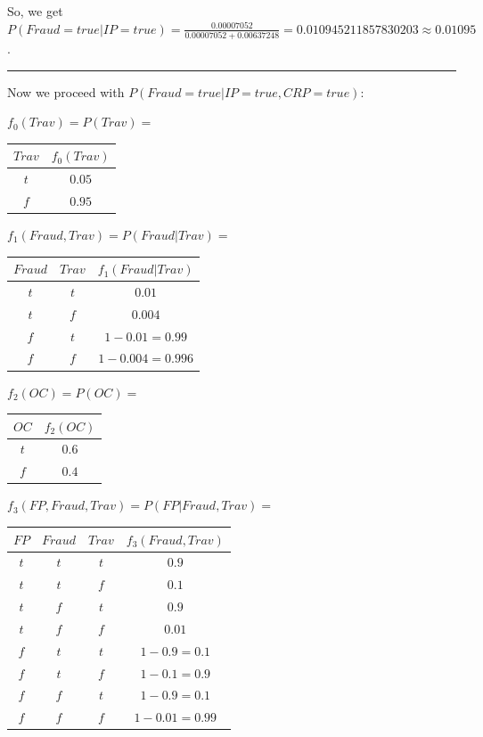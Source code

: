 \documentclass[10pt]{article}
\begin{document}
\begin{enumerate}
	So, we get $P(Fraud = true | IP = true) = \frac{0.00007052}{0.00007052 + 0.00637248} = 0.010945211857830203 \approx 0.01095$.
	
	\noindent\rule[0.5ex]{\linewidth/2}{1pt}
	
	Now we proceed with $P(Fraud = true | IP = true, CRP = true)$:
	
	$f_0(Trav) = P(Trav) = $
	\begin{tabular}{|c|c|}
	\hline
 	  $Trav$ & $f_0(Trav)$ \\
	\hline
	  $t$ & $ 0.05$  \\
	\hline
	  $f$ & $0.95$ \\
	\hline
	\end{tabular}

	$f_1(Fraud, Trav) = P(Fraud | Trav) =$
	\begin{tabular}{|c|c|c|}
	\hline
 	  $Fraud$ & $Trav$ & $f_1(Fraud | Trav)$ \\
	\hline
	  $t$ & $t$ & $0.01$  \\
	\hline
	 $t$ & $f$ & $0.004$  \\
	\hline
	  $f$ & $t$ & $1 - 0.01 = 0.99$ \\
	\hline
	$f$ & $f$ & $1 - 0.004 = 0.996$  \\
	\hline
	\end{tabular}
	
	$f_2(OC) = P(OC) = $
	\begin{tabular}{|c|c|}
	\hline
 	  $OC$ & $f_2(OC)$ \\
	\hline
	  $t$ & $ 0.6$  \\
	\hline
	  $f$ & $0.4$ \\
	\hline
	\end{tabular}
	
	$f_3(FP, Fraud, Trav) = P(FP | Fraud, Trav) = $
	\begin{tabular}{|c|c|c|c|}
	\hline
 	  $FP$ & $Fraud$ & $Trav$ & $f_3(Fraud, Trav)$ \\
 	  \hline
	  $t$ & $t$ & $t$ & $0.9$\\
	  \hline
	  $t$ & $t$ & $f$ & $0.1$\\
	  \hline
	  $t$ & $f$ & $t$ & $0.9$\\
	  \hline
	  $t$ & $f$ & $f$ & $0.01$\\
	  \hline
	  $f$ & $t$ & $t$ & $1 - 0.9 = 0.1$\\
	  \hline
	  $f$ & $t$ & $f$ & $1 - 0.1 = 0.9$\\
	  \hline
	  $f$ & $f$ & $t$ & $1 - 0.9 = 0.1$\\
	  \hline
	  $f$ & $f$ & $f$ & $1 - 0.01 = 0.99$\\
	  \hline
	\end{tabular}
	

\end{enumerate}
\end{document}
